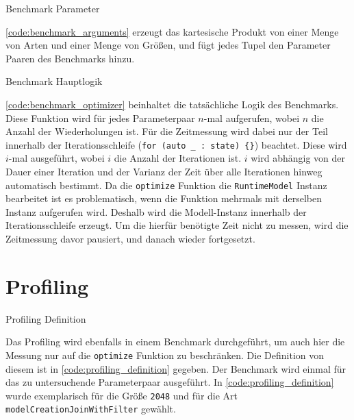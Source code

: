 \begin{listing}
    
\caption{Benchmark Parameter}
\label{code:benchmark_arguments}
\end{listing}

\autoref{code:benchmark_arguments} erzeugt das kartesische Produkt von einer
Menge von Arten und einer Menge von Größen, und fügt jedes Tupel den Parameter
Paaren des Benchmarks hinzu.

\begin{listing}
    
\caption{Benchmark Hauptlogik}
\label{code:benchmark_optimizer}
\end{listing}

\autoref{code:benchmark_optimizer} beinhaltet die tatsächliche Logik des
Benchmarks. Diese Funktion wird für jedes Parameterpaar $n$-mal aufgerufen,
wobei $n$ die Anzahl der Wiederholungen ist. Für die Zeitmessung wird dabei nur
der Teil innerhalb der Iterationsschleife (\verb+for (auto _ : state) {}+) beachtet. Diese
wird $i$-mal ausgeführt, wobei $i$ die Anzahl der Iterationen ist. $i$ wird
abhängig von der Dauer einer Iteration und der Varianz der Zeit über alle
Iterationen hinweg automatisch bestimmt. Da die \verb+optimize+ Funktion die
\verb+RuntimeModel+ Instanz bearbeitet ist es problematisch, wenn die Funktion
mehrmals mit derselben Instanz aufgerufen wird. Deshalb wird die
Modell-Instanz innerhalb der Iterationsschleife erzeugt. Um die hierfür
benötigte Zeit nicht zu messen, wird die Zeitmessung davor pausiert, und danach wieder
fortgesetzt.

\section{Profiling}

\begin{listing}
    
\caption{Profiling Definition}
\label{code:profiling_definition}
\end{listing}

Das Profiling wird ebenfalls in einem Benchmark durchgeführt, um auch hier die
Messung nur auf die \verb+optimize+ Funktion zu beschränken. Die Definition
von diesem ist in \autoref{code:profiling_definition} gegeben. Der Benchmark
wird einmal für das zu untersuchende Parameterpaar ausgeführt. In
\autoref{code:profiling_definition} wurde exemplarisch für die Größe \verb+2048+ und
für die Art \verb+modelCreationJoinWithFilter+ gewählt.

